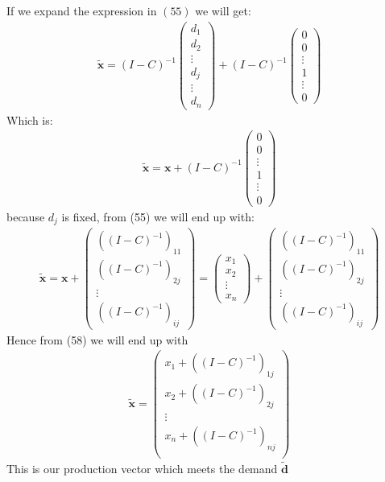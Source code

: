 \documentclass[11pt]{article}
\begin{document}
\newpage
If we expand the expression in $(55)$ we will get:
\begin{align}
\bm{\tilde{x}}=(I-C)^{-1}\left(\begin{array}{c}
d_1\\
d_2\\
\vdots \\
d_j \\ 
\vdots \\
d_n
\end{array}\right)+(I-C)^{-1}
\left(\begin{array}{c}
0 \\
0 \\
\vdots \\
1 \\ 
\vdots \\0
\end{array}\right)
\end{align}
Which is: 
\begin{align}
\bm{\tilde{x}}=\textbf{x}
+(I-C)^{-1}
\left(\begin{array}{c}
0 \\
0 \\
\vdots \\
1 \\ 
\vdots \\
0
\end{array}\right)
\end{align}
because $d_j$ is fixed, from (55) we will end up with:
\begin{align}
\bm{\tilde{x}}=\textbf{x}
+
\left(\begin{array}{c}
((I-C)^{-1})_{11} \\
((I-C)^{-1})_{2j} \\
\vdots \\
((I-C)^{-1})_{ij}
\end{array}\right)
=
\left(\begin{array}{c}
x_1\\
x_2\\
\vdots \\
x_n
\end{array}\right)
+
\left(\begin{array}{c}
((I-C)^{-1})_{11} \\
((I-C)^{-1})_{2j} \\
\vdots \\
((I-C)^{-1})_{ij}
\end{array}\right)
\end{align}
Hence from (58) we will end up with
\begin{align}
\bm{\tilde{x}}=
\left(\begin{array}{c}
x_1+((I-C)^{-1})_{1j} \\
x_2+((I-C)^{-1})_{2j} \\
\vdots \\
x_n+((I-C)^{-1})_{nj} \\
\end{array}\right)
\end{align}
This is our production vector which meets the demand $\bm{\tilde{d}}$
\end{document}
